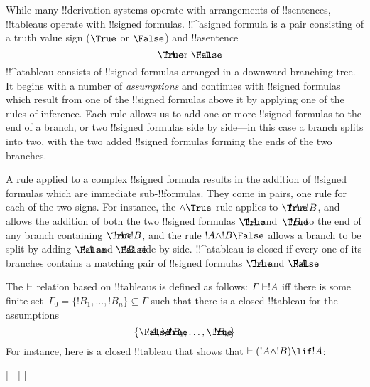 \documentclass[../../../include/open-logic-section]{subfiles}
\begin{document}
      {}
      {}


While many !!{derivation} systems operate with arrangements of
!!{sentence}s, !!{tableau}s operate with !!{signed formula}s.
!!^a{signed formula} is a pair consisting of a truth value sign
($\True$ or $\False$) and !!a{sentence}
\[
\sFmla{\True}{!A} \text{ or } \sFmla{\False}{!A}.
\]
!!^a{tableau} consists of !!{signed formula}s arranged in a
downward-branching tree. It begins with a number of \emph{assumptions}
and continues with !!{signed formula}s which result from one of the
!!{signed formula}s above it by applying one of the rules of
inference. Each rule allows us to add one or more !!{signed formula}s
to the end of a branch, or two !!{signed formula}s side by side---in
this case a branch splits into two, with the two added !!{signed
  formula}s forming the ends of the two branches.

A rule applied to a complex !!{signed formula} results in the addition
of !!{signed formula}s which are immediate sub-!!{formula}s. They come
in pairs, one rule for each of the two signs.  For instance, the
$\TRule{\True}{\land}$ rule applies to $\sFmla{\True}{!A \land !B}$,
and allows the addition of both the two !!{signed formula}s
$\sFmla{\True}{!A}$ and~$\sFmla{\True}{!B}$ to the end of any branch
containing $\sFmla{\True}{!A \land !B}$, and the rule
$\TRule{\False}{!A \land !B}$ allows a branch to be split by adding
$\sFmla{\False}{!A}$ and $\sFmla{\False}{!B}$ side-by-side.
!!^a{tableau} is closed if every one of its branches contains a
matching pair of !!{signed formula}s $\sFmla{\True}{!A}$ and
$\sFmla{\False}{!A}$.

The $\Proves$ relation based on !!{tableau}s is defined as follows:
$\Gamma \Proves !A$ iff there is some finite set~$\Gamma_0 = \{!B_1,
\dots, !B_n\} \subseteq \Gamma$ such that there is a closed !!{tableau}
for the assumptions
\[
\{\sFmla{\False}{!A}, \sFmla{\True}{!B_1}, \dots, \sFmla{\True}{!B_n}\} 
\]
For instance, here is a closed !!{tableau} that shows that $\Proves
(!A \land !B) \lif !A$:
\begin{oltableau}
  [\sFmla{\False}{(\formula{A} \land \formula{B}) \lif \formula{A}}, just = \TAss
    [\sFmla{\True}{\formula{A} \land \formula{B}}, just = {\TRule{\False}{\lif}[1]}
      [\sFmla{\False}{\formula{A}}, just = {\TRule{\False}{\lif}[1]}
        [\sFmla{\True}{\formula{A}}, just = {\TRule{\True}{\lif}[2]}
          [\sFmla{\True}{\formula{B}}, just = {\TRule{\True}{\lif}[2]}, close]
        ]
      ]
    ]
  ]
\end{oltableau}
\end{document}
